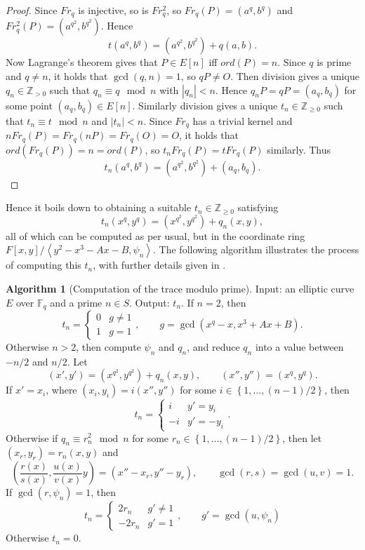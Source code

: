 \documentclass{article}
\newcommand{\F}{\mathbb{F}}
\newcommand{\Z}{\mathbb{Z}}
\newcommand{\rb}[1]{\left( #1 \right)}
\renewcommand{\sb}[1]{\left[ #1 \right]}
\newcommand{\cb}[1]{\left\{ #1 \right\}}
\newcommand{\ab}[1]{\left\langle #1 \right\rangle}
\newcommand{\abs}[1]{\left\lvert #1 \right\rvert}
\theoremstyle{definition}\newtheorem*{definition}{Definition}
\theoremstyle{definition}\newtheorem*{example}{Example}
\theoremstyle{definition}\newtheorem*{remark}{Remark}
\newtheorem{algorithm}[proposition]{Algorithm}
\begin{document}
\begin{proof}
Since $ Fr_q $ is injective, so is $ Fr_q^2 $, so $ Fr_q\rb{P} = \rb{a^q, b^q} $ and $ Fr_q^2\rb{P} = \rb{a^{q^2}, b^{q^2}} $. Hence
$$ t\rb{a^q, b^q} = \rb{a^{q^2}, b^{q^2}} + q\rb{a, b}. $$
Now Lagrange's theorem gives that $ P \in E\sb{n} $ iff $ ord\rb{P} = n $. Since $ q $ is prime and $ q \ne n $, it holds that $ \gcd\rb{q, n} = 1 $, so $ qP \ne O $. Then division gives a unique $ q_n \in \Z_{> 0} $ such that $ q_n \equiv q \mod n $ with $ \abs{q_n} < n $. Hence $ q_nP = qP = \rb{a_q, b_q} $ for some point $ \rb{a_q, b_q} \in E\sb{n} $. Similarly division gives a unique $ t_n \in \Z_{\ge 0} $ such that $ t_n \equiv t \mod n $ and $ \abs{t_n} < n $. Since $ Fr_q $ has a trivial kernel and $ nFr_q\rb{P} = Fr_q\rb{nP} = Fr_q\rb{O} = O $, it holds that $ ord\rb{Fr_q\rb{P}} = n = ord\rb{P} $, so $ t_nFr_q\rb{P} = tFr_q\rb{P} $ similarly. Thus
$$ t_n\rb{a^q, b^q} = \rb{a^{q^2}, b^{q^2}} + \rb{a_q, b_q}. $$
\end{proof}

Hence it boils down to obtaining a suitable $ t_n \in \Z_{\ge 0} $ satisfying
$$ t_n\rb{x^q, y^q} = \rb{x^{q^2}, y^{q^2}} + q_n\rb{x, y}, $$
all of which can be computed as per usual, but in the coordinate ring $ F\sb{x, y} / \ab{y^2 - x^3 - Ax - B, \psi_n} $. The following algorithm illustrates the process of computing this $ t_n $, with further details given in \cite{crypto}.

\begin{algorithm}[Computation of the trace modulo prime]
Input: an elliptic curve $ E $ over $ \F_q $ and a prime $ n \in S $. Output: $ t_n $. If $ n = 2 $, then
$$ t_n = \begin{cases} 0 & g \ne 1 \\ 1 & g = 1 \end{cases}, \qquad g = \gcd\rb{x^q - x, x^3 + Ax + B}. $$
Otherwise $ n > 2 $, then compute $ \psi_n $ and $ q_n $, and reduce $ q_n $ into a value between $ -n / 2 $ and $ n / 2 $. Let
$$ \rb{x', y'} = \rb{x^{q^2}, y^{q^2}} + q_n\rb{x, y}, \qquad \rb{x'', y''} = \rb{x^q, y^q}. $$
If $ x' = x_i $, where $ \rb{x_i, y_i} = i\rb{x'', y''} $ for some $ i \in \cb{1, \dots, \rb{n - 1} / 2} $, then
$$ t_n = \begin{cases} i & y' = y_i \\ -i & y' = -y_i \end{cases}. $$
Otherwise if $ q_n \equiv r_n^2 \mod n $ for some $ r_n \in \cb{1, \dots, \rb{n - 1} / 2} $, then let $ \rb{x_r, y_r} = r_n\rb{x, y} $ and
$$ \rb{\dfrac{r\rb{x}}{s\rb{x}}, \dfrac{u\rb{x}}{v\rb{x}}y} = \rb{x'' - x_r, y'' - y_r}, \qquad \gcd\rb{r, s} = \gcd\rb{u, v} = 1. $$
If $ \gcd\rb{r, \psi_n} = 1 $, then
$$ t_n = \begin{cases} 2r_n & g' \ne 1 \\ -2r_n & g' = 1 \end{cases}, \qquad g' = \gcd\rb{u, \psi_n} $$
Otherwise $ t_n = 0 $.
\end{algorithm}
\end{document}
